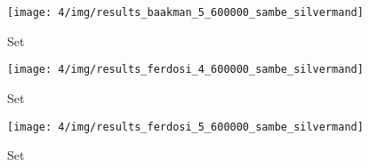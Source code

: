 \begin{subfigure}{0.3\textwidth}
	\centering
	\texttt{[image: 4/img/results\_baakman\_5\_600000\_sambe\_silvermand]}
	\caption{Set \baakmanFive}
	\label{fig:4:simulated:datasets:sambe:baakman5}
\end{subfigure}		
\begin{subfigure}{0.3\textwidth}
	\centering
	\texttt{[image: 4/img/results\_ferdosi\_4\_600000\_sambe\_silvermand]}
	\caption{Set \ferdosiFour}
	\label{fig:4:simulated:datasets:sambe:ferdosi4}
\end{subfigure}
\begin{subfigure}{0.3\textwidth}
	\centering
	\texttt{[image: 4/img/results\_ferdosi\_5\_600000\_sambe\_silvermand]}
	\caption{Set \ferdosiFive}
	\label{fig:4:simulated:datasets:sambe:ferdosi5}
\end{subfigure}	